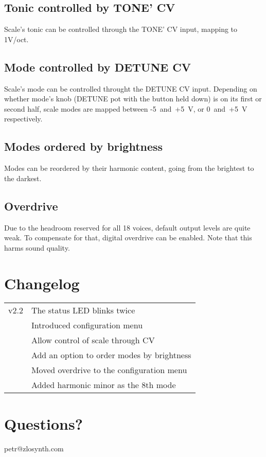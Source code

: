 \documentclass[10pt,nofoldmark,nocombine]{leaflet} %
\begin{document}
\subsection{Tonic controlled by TONE' CV}

Scale's tonic can be controlled through the TONE' CV input, mapping to 1V/oct.

\subsection{Mode controlled by DETUNE CV}

Scale's mode can be controlled throught the DETUNE CV input. Depending on whether mode's knob (DETUNE pot with the button held down) is on its first or second half, scale modes are mapped between -5~and~+5~V, or 0~and~+5~V respectively.

\subsection{Modes ordered by brightness}

Modes can be reordered by their harmonic content, going from the brightest to the darkest.

\subsection{Overdrive}

Due to the headroom reserved for all 18 voices, default output levels are quite weak. To compensate for that, digital overdrive can be enabled. Note that this harms sound quality.

\section{Changelog}

\begin{tabular}{@{}rl@{}}
  v2.2 & The status LED blinks twice \\
       & Introduced configuration menu \\
       & Allow control of scale through CV \\
       & Add an option to order modes by brightness \\
       & Moved overdrive to the configuration menu \\
       & Added harmonic minor as the 8th mode
\end{tabular}

\section{Questions?}

\begin{center}
petr@zlosynth.com
\end{center}
\end{document}
